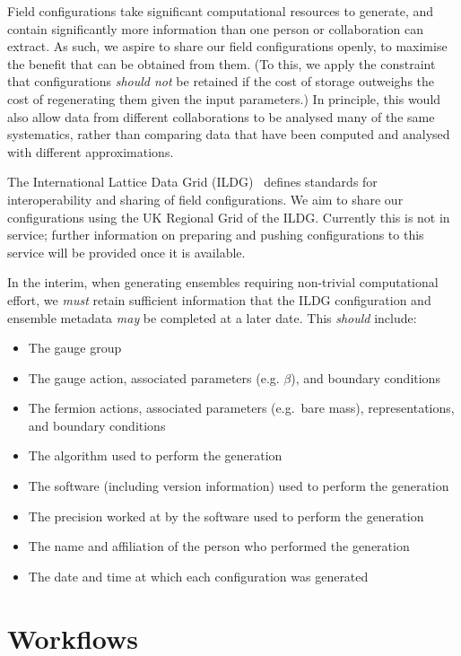 \documentclass{article}
\newcommand\rfcword[1]{\emph{#1}\xspace}
\newcommand\must{\rfcword{must}}
\newcommand\should{\rfcword{should}}
\newcommand\shouldnot{\rfcword{should not}}
\newcommand\may{\rfcword{may}}
\begin{document}
Field configurations take significant computational resources to generate,
and contain significantly more information than one person or collaboration can extract.
As such,
we aspire to share our field configurations openly,
to maximise the benefit that can be obtained from them.
(To this,
we apply the constraint that
configurations \shouldnot be retained if the cost of storage outweighs
the cost of regenerating them given the input parameters.)
In principle,
this would also allow data from different collaborations
to be analysed many of the same systematics,
rather than comparing data that have been computed and analysed with different approximations.

The International Lattice Data Grid (ILDG)~\cite{ildg-organization}
defines standards for interoperability and sharing of field configurations.
We aim to share our configurations using the UK Regional Grid of the ILDG\@.
Currently this is not in service;
further information on preparing and pushing configurations to this service
will be provided once it is available.

In the interim,
when generating ensembles requiring non-trivial computational effort,
we \must retain sufficient information that
the ILDG configuration and ensemble metadata \may be completed at a later date.
This \should include:

\begin{itemize}
  \item
        The gauge group
  \item
        The gauge action, associated parameters (e.g. $\beta$), and boundary conditions
  \item
        The fermion actions, associated parameters (e.g.\ bare mass), representations, and boundary conditions
  \item
        The algorithm used to perform the generation
  \item
        The software (including version information) used to perform the generation
  \item
        The precision worked at by the software used to perform the generation
  \item
        The name and affiliation of the person who performed the generation
  \item
        The date and time at which each configuration was generated
\end{itemize}


\section{Workflows}\label{sec:workflows}
\end{document}
